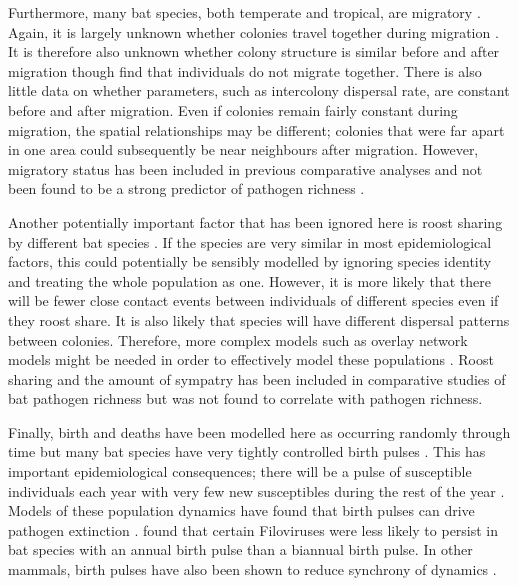 Furthermore, many bat species, both temperate and tropical, are migratory \cite{fleming2003ecology, krauel2013recent, popa2009bats, hutterer2005bat}.
Again, it is largely unknown whether colonies travel together during migration \cite{baerwald2016migratory}. 
It is therefore also unknown whether colony structure is similar before and after migration \cite{carter2013cooperation} though \textcite{kurta2002philopatry} find that individuals do not migrate together.
There is also little data on whether parameters, such as intercolony dispersal rate, are constant before and after migration.
Even if colonies remain fairly constant during migration, the spatial relationships may be different; colonies that were far apart in one area could subsequently be near neighbours after migration.
However, migratory status has been included in previous comparative analyses and not been found to be a strong predictor of pathogen richness \cite{turmelle2009correlates, maganga2014bat}. 

Another potentially important factor that has been ignored here is roost sharing by different bat species \cite{maganga2014bat, lopez2014seroprevalence, serra2002european, pons2014insights, deThoisy2016bioecological}.
If the species are very similar in most epidemiological factors, this could potentially be sensibly modelled by ignoring species identity and treating the whole population as one.
However, it is more likely that there will be fewer close contact events between individuals of different species even if they roost share.
It is also likely that species will have different dispersal patterns between colonies.
Therefore, more complex models such as overlay network models might be needed in order to effectively model these populations \cite{funk2010interacting, marceau2011modeling}.
Roost sharing and the amount of sympatry has been included in comparative studies of bat pathogen richness \cite{maganga2014bat} but was not found to correlate with pathogen richness.

Finally, birth and deaths have been modelled here as occurring randomly through time but many bat species have very tightly controlled birth pulses \cite{dietrich2015leptospira, george2011host, porter2001birth, greiner2011predictable}.
This has important epidemiological consequences; there will be a pulse of susceptible individuals each year with very few new susceptibles during the rest of the year \cite{dietrich2015leptospira}.
Models of these population dynamics have found that birth pulses can drive pathogen extinction \cite{peel2014effect}.
\textcite{hayman2015biannual} found that certain Filoviruses were less likely to persist in bat species with an annual birth pulse than a biannual birth pulse.
In other mammals, birth pulses have also been shown to reduce synchrony of dynamics \cite{duke2011strong}.

